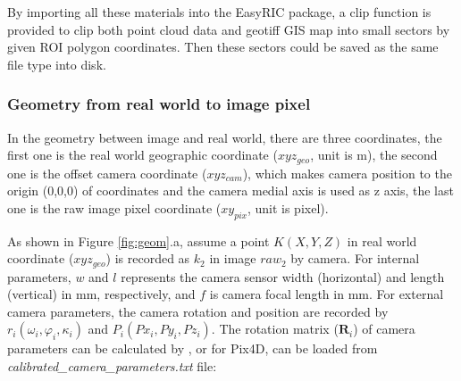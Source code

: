 \documentclass{configs/bmcart}
\begin{document}
By importing all these materials into the EasyRIC package, a clip function is provided to clip both point cloud data and geotiff GIS map into small sectors by given ROI polygon coordinates. Then these sectors could be saved as the same file type into disk.

\subsubsection*{Geometry from real world to image pixel}
In the geometry between image and real world, there are three coordinates, the first one is the real world geographic coordinate ($xyz_{geo}$, unit is m), the second one is the offset camera coordinate ($xyz_{cam}$), which makes camera position to the origin (0,0,0) of coordinates and the camera medial axis is used as z axis, the last one is the raw image pixel coordinate ($xy_{pix}$, unit is pixel). 

As shown in Figure \ref{fig:geom}.a, assume a point $K(X,Y,Z)$ in real world coordinate ($xyz_{geo}$) is recorded as $k_2$ in image $raw_2$ by camera. For internal parameters, $w$ and $l$ represents the camera sensor width (horizontal) and length (vertical) in mm, respectively, and $f$ is camera focal length in mm. For external camera parameters, the camera rotation and position are recorded by $r_i (\omega_i, \varphi_i, \kappa_i)$ \cite{pix4d_support_yaw_2020} and $P_i (Px_{i}, Py_{i}, Pz_{i})$. The rotation matrix ($\mathbf{R}_i$) of camera parameters 
can be calculated by \cite{pix4d_support_how_2020}, or for Pix4D, can be loaded from \textit{calibrated\_camera\_parameters.txt} file:
\end{document}

